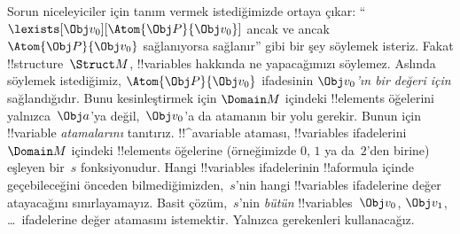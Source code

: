 \documentclass[../../../include/open-logic-section]{subfiles}
\begin{document}
Sorun niceleyiciler için tanım vermek istediğimizde ortaya çıkar:
``$\lexists[\Obj v_0][\Atom{\Obj P}{\Obj v_0}]$ ancak ve ancak
$\Atom{\Obj P}{\Obj v_0}$ sağlanıyorsa sağlanır'' gibi bir şey
söylemek isteriz. Fakat !!{structure}~$\Struct M$, !!{variable}s
hakkında ne yapacağımızı söylemez. Aslında söylemek istediğimiz,
$\Atom{\Obj P}{\Obj v_0}$ ifadesinin \emph{$\Obj v_0$'ın bir değeri
için} sağlandığıdır. Bunu kesinleştirmek için $\Domain M$ içindeki
!!{element}s öğelerini yalnızca~$\Obj a$'ya değil,~$\Obj v_0$'a da
atamanın bir yolu gerekir. Bunun için !!{variable} \emph{atamalarını}
tanıtırız. !!^a{variable} ataması, !!{variable}s ifadelerini
$\Domain M$ içindeki !!{element}s öğelerine (örneğimizde $0$, $1$ ya
da~$2$'den birine) eşleyen bir~$s$ fonksiyonudur. Hangi
!!{variable}s ifadelerinin !!a{formula} içinde geçebileceğini önceden
bilmediğimizden,~$s$'nin hangi !!{variable}s ifadelerine değer
atayacağını sınırlayamayız. Basit çözüm,~$s$'nin \emph{bütün}
!!{variable}s~$\Obj v_0$, $\Obj v_1$, \dots\ ifadelerine değer
atamasını istemektir. Yalnızca gerekenleri kullanacağız.
\end{document}
